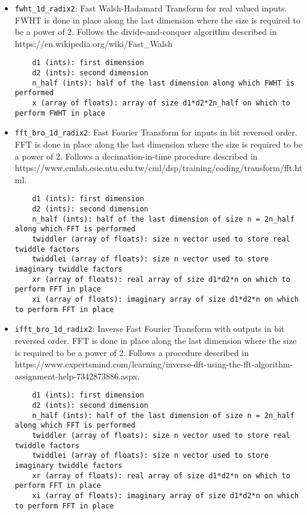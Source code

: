 \begin{itemize}
\item
\texttt{fwht\_1d\_radix2}: 
Fast Walsh-Hadamard Transform for real valued inputs.
FWHT is done in place along the last dimension where the size is required to be a power of 2.
Follows the divide-and-conquer algorithm described in https://en.wikipedia.org/wiki/Fast_Walsh%
\begin{lstlisting}
	d1 (ints): first dimension
    d2 (ints): second dimension
    n_half (ints): half of the last dimension along which FWHT is performed
    x (array of floats): array of size d1*d2*2n_half on which to perform FWHT in place
\end{lstlisting}
\item
\texttt{fft\_bro\_1d\_radix2}: 
Fast Fourier Transform for inputs in bit reversed order.
FFT is done in place along the last dimension where the size is required to be a power of 2.
Follows a decimation-in-time procedure described in https://www.cmlab.csie.ntu.edu.tw/cml/dsp/training/coding/transform/fft.html.
\begin{lstlisting}
	d1 (ints): first dimension
    d2 (ints): second dimension
    n_half (ints): half of the last dimension of size n = 2n_half along which FFT is performed
    twiddler (array of floats): size n vector used to store real twiddle factors
    twiddlei (array of floats): size n vector used to store imaginary twiddle factors 
    xr (array of floats): real array of size d1*d2*n on which to perform FFT in place
    xi (array of floats): imaginary array of size d1*d2*n on which to perform FFT in place
\end{lstlisting}
\item
\texttt{ifft\_bro\_1d\_radix2}: 
Inverse Fast Fourier Transform with outputs in bit reversed order.
FFT is done in place along the last dimension where the size is required to be a power of 2.
Follows a procedure described in https://www.expertsmind.com/learning/inverse-dft-using-the-fft-algorithm-assignment-help-7342873886.aspx.
\begin{lstlisting}
	d1 (ints): first dimension
    d2 (ints): second dimension
    n_half (ints): half of the last dimension of size n = 2n_half along which FFT is performed
    twiddler (array of floats): size n vector used to store real twiddle factors
    twiddlei (array of floats): size n vector used to store imaginary twiddle factors 
    xr (array of floats): real array of size d1*d2*n on which to perform FFT in place
    xi (array of floats): imaginary array of size d1*d2*n on which to perform FFT in place
\end{lstlisting}
\end{itemize}